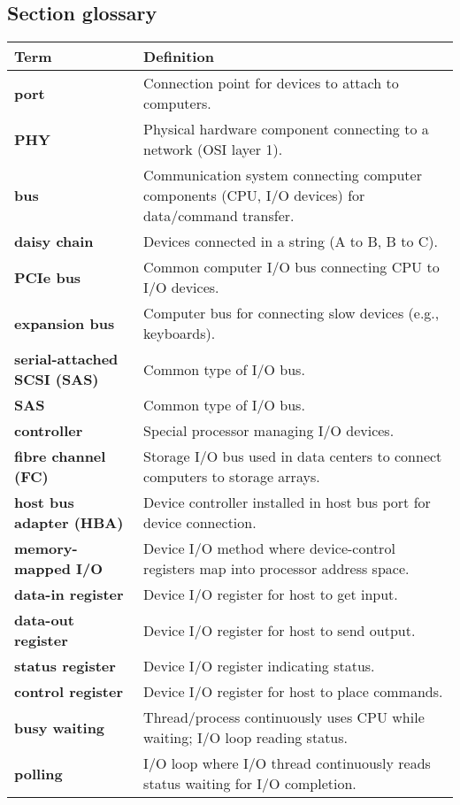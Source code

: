 \subsection{Section glossary}
\begin{tabular}{p{}p{}}
    \toprule
    \textbf{Term} & \textbf{Definition} \\
    \midrule
    \textbf{port} & Connection point for devices to attach to computers. \\
    \textbf{PHY} & Physical hardware component connecting to a network (OSI layer 1). \\
    \textbf{bus} & Communication system connecting computer components (CPU, I/O devices) for data/command transfer. \\
    \textbf{daisy chain} & Devices connected in a string (A to B, B to C). \\
    \textbf{PCIe bus} & Common computer I/O bus connecting CPU to I/O devices. \\
    \textbf{expansion bus} & Computer bus for connecting slow devices (e.g., keyboards). \\
    \textbf{serial-attached SCSI (SAS)} & Common type of I/O bus. \\
    \textbf{SAS} & Common type of I/O bus. \\
    \textbf{controller} & Special processor managing I/O devices. \\
    \textbf{fibre channel (FC)} & Storage I/O bus used in data centers to connect computers to storage arrays. \\
    \textbf{host bus adapter (HBA)} & Device controller installed in host bus port for device connection. \\
    \textbf{memory-mapped I/O} & Device I/O method where device-control registers map into processor address space. \\
    \textbf{data-in register} & Device I/O register for host to get input. \\
    \textbf{data-out register} & Device I/O register for host to send output. \\
    \textbf{status register} & Device I/O register indicating status. \\
    \textbf{control register} & Device I/O register for host to place commands. \\
    \textbf{busy waiting} & Thread/process continuously uses CPU while waiting; I/O loop reading status. \\
    \textbf{polling} & I/O loop where I/O thread continuously reads status waiting for I/O completion. \\

\end{tabular}
